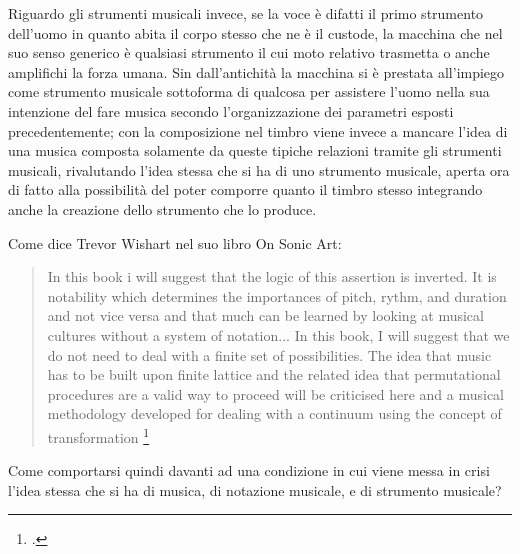 Riguardo gli strumenti musicali invece, se la voce è difatti il primo strumento dell'uomo in quanto 
abita il corpo stesso che ne è il custode, la macchina che nel suo senso generico è qualsiasi strumento 
il cui moto relativo trasmetta o anche amplifichi la forza umana.
Sin dall'antichità la macchina si è prestata all'impiego come strumento musicale sottoforma di qualcosa per assistere l'uomo nella 
sua intenzione del fare musica secondo l'organizzazione dei parametri esposti precedentemente; 
con la composizione nel timbro viene invece a mancare l'idea 
di una musica composta solamente da queste tipiche relazioni tramite gli strumenti musicali, 
rivalutando l'idea stessa che si ha di uno strumento musicale, aperta ora di fatto alla possibilità 
del poter comporre quanto il timbro stesso integrando anche la creazione dello strumento che lo produce. 

Come dice Trevor Wishart nel suo libro On Sonic Art:

\begin{quote}
    In this book i will suggest that the logic of this assertion is inverted.
    It is notability which determines the importances of pitch, rythm, and duration and
    not vice versa and that much can be learned by looking at 
    musical cultures without a system of notation... 
    In this book, I will suggest that we do not need to deal with a finite set of
    possibilities. The idea that music has to be built upon  finite lattice and the
    related idea that permutational procedures are a valid way to proceed will
    be criticised here and a musical methodology developed for dealing with a
    continuum using the concept of transformation \footcite{wishart_on_sonic_art}
\end{quote}

Come comportarsi quindi davanti ad una condizione in cui viene messa in crisi l'idea stessa
che si ha di musica, di notazione musicale, e di strumento musicale?

